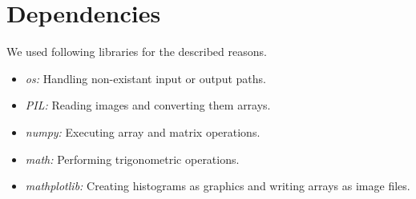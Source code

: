 \documentclass[conference]{IEEEtran}
\begin{document}
\section{Dependencies}
We used following libraries for the described reasons.
\begin{itemize}
	\item \textit{os:} Handling non-existant input or output paths.
	\item \textit{PIL:} Reading images and converting them arrays.
	\item \textit{numpy:} Executing array and matrix operations.
	\item \textit{math:} Performing trigonometric operations.
	\item \textit{mathplotlib:} Creating histograms as graphics and writing arrays as image files.
\end{itemize}
\end{document}
